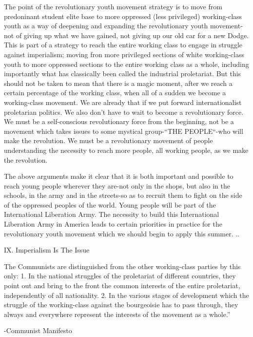 \documentclass[12pt, titlepage]{article}
\begin{document}
{\begin{spacing}{1.10}
The point of the revolutionary youth movement strategy is to move from predoninant student elite base to more oppressed (less privileged) working-class youth as a way of deepening and expanding the revolutionary youth movement-not of giving up what we have gained, not giving up our old car for a new Dodge. This is part of a strategy to reach the entire working class to engage in struggle against imperialism; moving fron more privileged sections of white working-class youth to more oppressed sections to the entire working class as a whole, including importantly what has classically been called the industrial proletariat. But this should not be taken to mean that there is a magic moment, after we reach a certain percentage of the working class, when all of a sudden we become a working-class movement. We are already that if we put forward internationalist proletarian politics. We also don't have to wait to become a revolutionary force. We must be a self-conscious revolutionary force from the beginning, not be a movement which takes issues to some mystical group-``THE PEOPLE``-who will make the revolution. We must be a revolutionary movement of people understanding the necessity to reach more people, all working people, as we make the revolution.

The above arguments make it clear that it is both important and possible to reach young people wherever they are-not only in the shops, but also in the schools, in the army and in the streets-so as to recruit them to fight on the side of the oppressed peoples of the world. Young people will be part of the International Liberation Army. The necessity to build this International Liberation Army in America leads to certain priorities in practice for the revolutionary youth movement which we should begin to apply this summer. ..

\begin{center}
IX. Imperialism Is The Issue
\end{center}

The Communists are distinguished from the other working-class parties by this only: 1. In the national struggles of the proletariat of different countries, they point out and bring to the front the common interests of the entire proletariat, independently of all nationality. 2. In the various stages of development which the struggle of the working-class against the bourgeoisie has to pass through, they always and everywhere represent the interests of the movement as a whole.''

-Communist Manifesto


\end{spacing}}
\end{document}
